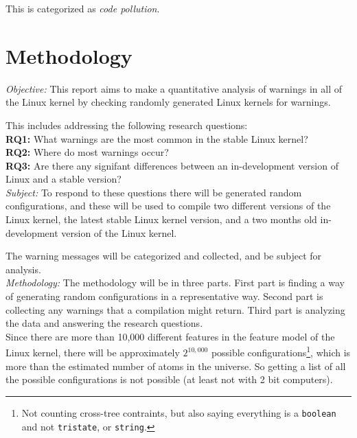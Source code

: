 \documentclass[a4paper,11pt]{report}
\newcommand{\f}{\footnote{\fn}}
\begin{document}
This is categorized as \emph{code pollution}.

\newpage
\chapter{Methodology}

\emph{Objective:}
This report aims to make a quantitative analysis of warnings in all of the
Linux kernel by checking randomly generated Linux kernels for warnings.

This includes addressing the following research questions:
\\

\textbf{RQ1:} What warnings are the most common in the stable Linux kernel?
\\

\textbf{RQ2:} Where do most warnings occur?
\\

\textbf{RQ3:} Are there any signifant differences between an in-development 
version of Linux and a stable version?
\\

\emph{Subject:}
To respond to these questions there will be generated random configurations, 
and these will be used to compile two different versions of the Linux kernel, 
the latest stable Linux kernel version, and a two months old in-development 
version of the Linux kernel.

The warning messages will be categorized and collected, and be subject for 
analysis.
\\

\emph{Methodology:}
The methodology will be in three parts. First part is finding a way of
generating random configurations in a representative way. Second part is 
collecting any warnings that a compilation might return. Third part is 
analyzing the data and answering the research questions.
\\

        \def \fn{Not counting cross-tree contraints, but also saying 
        everything is a \texttt{boolean} and not \texttt{tristate}, or 
        \texttt{string}.}
Since there are more than 10,000 different features in the feature model of the
Linux kernel, there will be approximately $2^{10,000}$ possible 
configurations\f, which is more than the estimated number of atoms in the 
universe. So getting a list of all the possible configurations is not possible 
(at least not with 2 bit computers).
\end{document}
